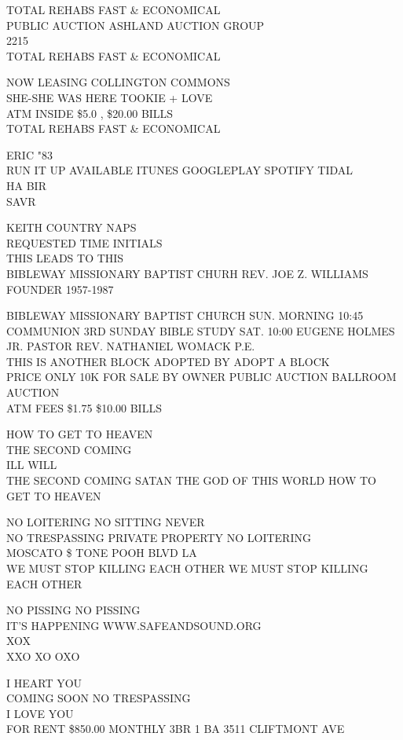 \documentclass[10pt,letterpaper]{article}
\begin{document}
TOTAL REHABS FAST \& ECONOMICAL\\
PUBLIC AUCTION ASHLAND AUCTION GROUP\\
2215\\
TOTAL REHABS FAST \& ECONOMICAL

NOW LEASING COLLINGTON COMMONS\\
SHE{-}SHE WAS HERE TOOKIE + LOVE\\
ATM INSIDE \$5.0 , \$20.00 BILLS\\
TOTAL REHABS FAST \& ECONOMICAL

ERIC "83\\
RUN IT UP AVAILABLE ITUNES GOOGLEPLAY SPOTIFY TIDAL\\
HA BIR\\
SAVR

KEITH COUNTRY NAPS\\
REQUESTED TIME INITIALS\\
THIS LEADS TO THIS\\
BIBLEWAY MISSIONARY BAPTIST CHURH REV. JOE Z. WILLIAMS FOUNDER 1957{-}1987

BIBLEWAY MISSIONARY BAPTIST CHURCH SUN. MORNING 10:45 COMMUNION 3RD SUNDAY BIBLE STUDY SAT. 10:00 EUGENE HOLMES JR. PASTOR REV. NATHANIEL WOMACK P.E.\\
THIS IS ANOTHER BLOCK ADOPTED BY ADOPT A BLOCK\\
PRICE ONLY 10K FOR SALE BY OWNER PUBLIC AUCTION BALLROOM AUCTION\\
ATM FEES \$1.75 \$10.00 BILLS

HOW TO GET TO HEAVEN\\
THE SECOND COMING\\
ILL WILL\\
THE SECOND COMING SATAN THE GOD OF THIS WORLD HOW TO GET TO HEAVEN

NO LOITERING NO SITTING NEVER\\
NO TRESPASSING PRIVATE PROPERTY NO LOITERING\\
MOSCATO \$ TONE POOH BLVD LA\\
WE MUST STOP KILLING EACH OTHER WE MUST STOP KILLING EACH OTHER

NO PISSING NO PISSING\\
IT'S HAPPENING WWW.SAFEANDSOUND.ORG\\
XOX\\
XXO XO OXO

I HEART YOU\\
COMING SOON NO TRESPASSING\\
I LOVE YOU\\
FOR RENT \$850.00 MONTHLY 3BR 1 BA 3511 CLIFTMONT AVE
\end{document}
